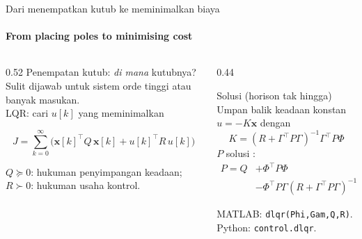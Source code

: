 \documentclass[aspectratio=169,10pt]{beamer}
\begin{document}
\begin{frame}{Dari menempatkan kutub ke meminimalkan biaya}
	\framesubtitle{From placing poles to minimising cost}
	\begin{columns}[T]
		\begin{column}{0.52\textwidth}
			\small
			Penempatan kutub: \textit{di mana} kutubnya? Sulit dijawab untuk sistem orde tinggi atau banyak masukan.\\[4pt]
			LQR: cari $u[k]$ yang meminimalkan
			\begin{block}{}
				\[
					J = \sum_{k=0}^{\infty}\Big(\mathbf{x}[k]^\top Q\,\mathbf{x}[k] + u[k]^\top R\,u[k]\Big)
				\]
			\end{block}
			$Q \succeq 0$: hukuman penyimpangan keadaan; $R \succ 0$: hukuman usaha kontrol.
		\end{column}
		\begin{column}{0.44\textwidth}
			\begin{block}{Solusi (horison tak hingga)}
				\small
				Umpan balik keadaan konstan $u = -K\mathbf{x}$ dengan
				\[
					K = (R + \Gamma^\top P\Gamma)^{-1}\Gamma^\top P\Phi
				\]
				$P$ solusi :
				\begin{align*}
					P = Q &+ \Phi^\top P\Phi\\
					&- \Phi^\top P\Gamma(R + \Gamma^\top P\Gamma)^{-1}\Gamma^\top P\Phi
				\end{align*}
			\end{block}
			{\scriptsize MATLAB: \texttt{dlqr(Phi,Gam,Q,R)}. Python: \texttt{control.dlqr}.}
		\end{column}
	\end{columns}
\end{frame}
\end{document}
